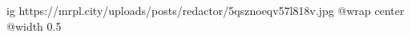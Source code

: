  
 
 
 
 

\ifcmt
  ig https://mrpl.city/uploads/posts/redactor/5qsznoeqv57l818v.jpg
  @wrap center
  @width 0.5
\fi
